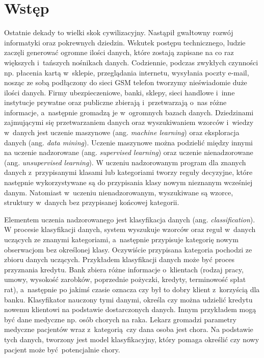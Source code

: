 \chapter*{Wstęp}
Ostatnie dekady to wielki skok cywilizacyjny. Nastąpił gwałtowny rozwój informatyki oraz pokrewnych dziedzin. Wskutek postępu technicznego, ludzie zaczęli generować ogromne ilości danych, które zostają zapisane na co raz większych i~tańszych nośnikach danych. Codziennie, podczas zwykłych czynności np. płacenia kartą w~sklepie, przeglądania internetu, wysyłania poczty e-mail, nosząc ze sobą podłączony do sieci GSM telefon tworzymy nieświadomie duże ilości danych. Firmy ubezpieczeniowe, banki, sklepy, sieci handlowe i~inne instytucje prywatne oraz publiczne zbierają i~przetwarzają o~nas różne informacje, a~następnie gromadzą je w~ogromnych bazach danych. Dziedzinami zajmującymi się przetwarzaniem danych oraz wyszukiwaniem wzorców i~wiedzy w~danych jest uczenie maszynowe (ang. \textit{machine learning}) oraz eksploracja danych (ang. \textit{data mining}). Uczenie maszynowe można podzielić między innymi na uczenie nadzorowane (ang. \textit{supervised learning}) oraz uczenie nienadzorowane (ang. \textit{unsupervised learning}). W uczeniu nadzorowanym program dla znanych danych z~przypisanymi klasami lub kategoriami tworzy reguły decyzyjne, które następnie wykorzystywane są do przypisania klasy nowym nieznanym wcześniej danym. Natomiast w~uczeniu nienadzorowanym, wyszukiwane są wzorce, struktury w~danych bez przypisanej końcowej kategorii. \par 
Elementem uczenia nadzorowanego jest klasyfikacja danych (ang. \textit{classification}). W procesie klasyfikacji danych, system wyszukuje wzorców oraz reguł w~danych uczących ze znanymi kategoriami, a~następnie przypisuje kategorię nowym obserwacjom bez określonej klasy. Oczywiście przypisana kategoria pochodzi ze zbioru danych uczących. Przykładem klasyfikacji danych może być proces przyznania kredytu. Bank zbiera różne informacje o~klientach (rodzaj pracy, umowy, wysokość zarobków, poprzednie pożyczki, kredyty, terminowość spłat rat), a~następnie po jakimś czasie oznacza czy był to dobry klient z~korzyścią dla banku. Klasyfikator nauczony tymi danymi, określa czy można udzielić kredytu nowemu klientowi na podstawie dostarczonych danych. Innym przykładem mogą być dane medyczne np. osób chorych na raka. Lekarz gromadzi parametry medyczne pacjentów wraz z~kategorią czy dana osoba jest chora. Na podstawie tych danych, tworzony jest model klasyfikacyjny, który pomaga określić czy nowy pacjent może być potencjalnie chory.\par 

